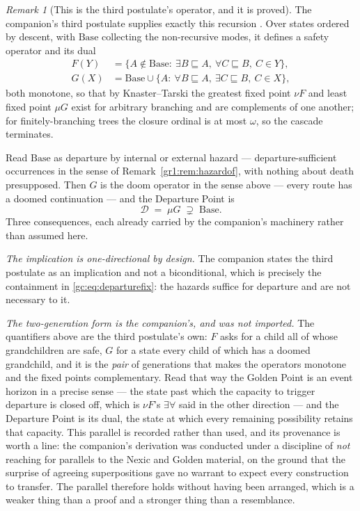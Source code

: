 \documentclass[11pt]{article}
\numberwithin{equation}{section}
\theoremstyle{plain}
\theoremstyle{definition}
\theoremstyle{remark}
\newtheorem{remark}[theorem]{Remark}
\begin{document}
\begin{remark}[This is the third postulate's operator, and it is proved]
\label{gc:rem:thirdpostulate}
The companion's third postulate supplies exactly this recursion
\cite{Aethus}. Over states ordered by descent, with $\mathrm{Base}$
collecting the non-recursive modes, it defines a safety operator and
its dual
\begin{align*}
F(Y)&=\bigl\{A\notin\mathrm{Base}:\ \exists B\sqsubseteq A,\
\forall C\sqsubseteq B,\ C\in Y\bigr\},\\
G(X)&=\mathrm{Base}\cup\bigl\{A:\ \forall B\sqsubseteq A,\
\exists C\sqsubseteq B,\ C\in X\bigr\},
\end{align*}
both monotone, so that by Knaster--Tarski the greatest fixed point
$\nu F$ and least fixed point $\mu G$ exist for arbitrary branching and
are complements of one another; for finitely-branching trees the
closure ordinal is at most $\omega$, so the cascade terminates.

Read $\mathrm{Base}$ as departure by internal or external hazard
--- departure-sufficient occurrences in the sense of
Remark~\ref{gr1:rem:hazardof}, with nothing about death presupposed.
Then $G$ is the doom operator in the sense above --- every route has a
doomed continuation --- and the Departure Point is
\begin{equation}\label{gc:eq:departurefix}
\mathcal{D}\;=\;\mu G\;\supsetneq\;\mathrm{Base}.
\end{equation}
Three consequences, each already carried by the companion's
machinery rather than assumed here.

\emph{The implication is one-directional by design.} The companion
states the third postulate as an implication and not a biconditional,
which is precisely the containment in \eqref{gc:eq:departurefix}: the
hazards suffice for departure and are not necessary to it.

\emph{The two-generation form is the companion's, and was not imported.}
The quantifiers above are the third postulate's own: $F$ asks for a child
all of whose grandchildren are safe, $G$ for a state every child of which
has a doomed grandchild, and it is the \emph{pair} of generations that
makes the operators monotone and the fixed points complementary. Read
that way the Golden Point is an event horizon in a precise sense --- the
state past which the capacity to trigger departure is closed off, which
is $\nu F$'s $\exists\forall$ said in the other direction --- and the
Departure Point is its dual, the state at which every remaining
possibility retains that capacity. This parallel is recorded rather than
used, and its provenance is worth a line: the companion's derivation was
conducted under a discipline of \emph{not} reaching for parallels to the
Nexic and Golden material, on the ground that the surprise of agreeing
superpositions gave no warrant to expect every construction to transfer.
The parallel therefore holds without having been arranged, which is a
weaker thing than a proof and a stronger thing than a resemblance.


\end{remark}
\end{document}
